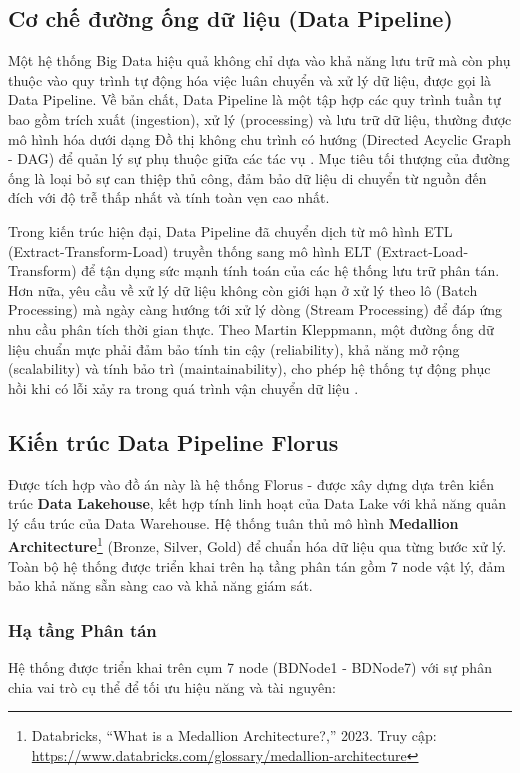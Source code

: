\subsection{Cơ chế đường ống dữ liệu (Data Pipeline)}

Một hệ thống Big Data hiệu quả không chỉ dựa vào khả năng lưu trữ mà còn phụ thuộc vào quy trình tự động hóa việc luân chuyển và xử lý dữ liệu, được gọi là Data Pipeline. Về bản chất, Data Pipeline là một tập hợp các quy trình tuần tự bao gồm trích xuất (ingestion), xử lý (processing) và lưu trữ dữ liệu, thường được mô hình hóa dưới dạng Đồ thị không chu trình có hướng (Directed Acyclic Graph - DAG) để quản lý sự phụ thuộc giữa các tác vụ \cite{Reis2022}. Mục tiêu tối thượng của đường ống là loại bỏ sự can thiệp thủ công, đảm bảo dữ liệu di chuyển từ nguồn đến đích với độ trễ thấp nhất và tính toàn vẹn cao nhất.

Trong kiến trúc hiện đại, Data Pipeline đã chuyển dịch từ mô hình ETL (Extract-Transform-Load) truyền thống sang mô hình ELT (Extract-Load-Transform) để tận dụng sức mạnh tính toán của các hệ thống lưu trữ phân tán. Hơn nữa, yêu cầu về xử lý dữ liệu không còn giới hạn ở xử lý theo lô (Batch Processing) mà ngày càng hướng tới xử lý dòng (Stream Processing) để đáp ứng nhu cầu phân tích thời gian thực. Theo Martin Kleppmann, một đường ống dữ liệu chuẩn mực phải đảm bảo tính tin cậy (reliability), khả năng mở rộng (scalability) và tính bảo trì (maintainability), cho phép hệ thống tự động phục hồi khi có lỗi xảy ra trong quá trình vận chuyển dữ liệu \cite{Kleppmann2017}.

\subsection{Kiến trúc Data Pipeline Florus}

Được tích hợp vào đồ án này là hệ thống Florus - được xây dựng dựa trên kiến trúc \textbf{Data Lakehouse}, kết hợp tính linh hoạt của Data Lake với khả năng quản lý cấu trúc của Data Warehouse. Hệ thống tuân thủ mô hình \textbf{Medallion Architecture}\footnote{Databricks, ``What is a Medallion Architecture?,'' 2023. Truy cập: \url{https://www.databricks.com/glossary/medallion-architecture}} (Bronze, Silver, Gold) để chuẩn hóa dữ liệu qua từng bước xử lý. Toàn bộ hệ thống được triển khai trên hạ tầng phân tán gồm 7 node vật lý, đảm bảo khả năng sẵn sàng cao và khả năng giám sát.

\subsubsection{Hạ tầng Phân tán}
Hệ thống được triển khai trên cụm 7 node (BDNode1 - BDNode7) với sự phân chia vai trò cụ thể để tối ưu hiệu năng và tài nguyên:

